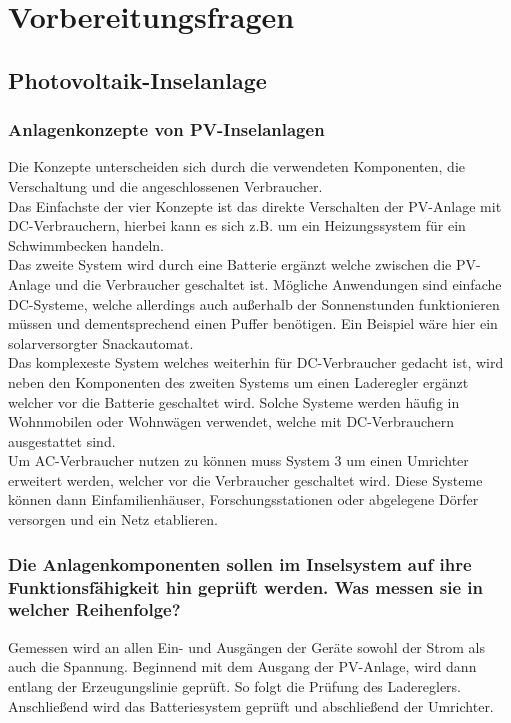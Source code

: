 \newpage
\section{Vorbereitungsfragen}
\subsection{Photovoltaik-Inselanlage}
\subsubsection{Anlagenkonzepte von PV-Inselanlagen }
Die Konzepte unterscheiden sich durch die verwendeten
Komponenten, die Verschaltung und die angeschlossenen Verbraucher.\\
Das Einfachste der vier Konzepte ist das direkte Verschalten der PV-Anlage mit
DC-Verbrauchern, hierbei kann es sich z.B. um ein Heizungssystem für ein Schwimmbecken handeln.\\
Das zweite System wird durch eine Batterie ergänzt welche zwischen die PV-Anlage und die Verbraucher geschaltet ist.
Mögliche Anwendungen sind einfache DC-Systeme, welche allerdings auch außerhalb der Sonnenstunden
funktionieren müssen und dementsprechend einen Puffer benötigen. Ein Beispiel wäre hier ein solarversorgter Snackautomat.\\
Das komplexeste System welches weiterhin für DC-Verbraucher gedacht ist, wird neben den Komponenten des zweiten Systems
um einen Laderegler ergänzt welcher vor die Batterie geschaltet wird. Solche Systeme werden häufig in
Wohnmobilen oder Wohnwägen verwendet, welche mit DC-Verbrauchern ausgestattet sind.\\
Um AC-Verbraucher nutzen zu können muss System 3 um einen Umrichter erweitert werden, welcher vor die Verbraucher geschaltet wird. Diese Systeme können dann Einfamilienhäuser, Forschungsstationen oder abgelegene Dörfer versorgen und ein Netz etablieren.\\ 
\subsubsection{Die Anlagenkomponenten sollen im Inselsystem auf ihre Funktionsfähigkeit hin geprüft werden. Was messen sie in welcher Reihenfolge?}
Gemessen wird an allen Ein- und Ausgängen der Geräte sowohl der Strom als auch die Spannung.
Beginnend mit dem Ausgang der PV-Anlage, wird dann entlang der Erzeugungslinie geprüft.
So folgt die Prüfung des Ladereglers. Anschließend wird das Batteriesystem geprüft und abschließend der Umrichter.\\


